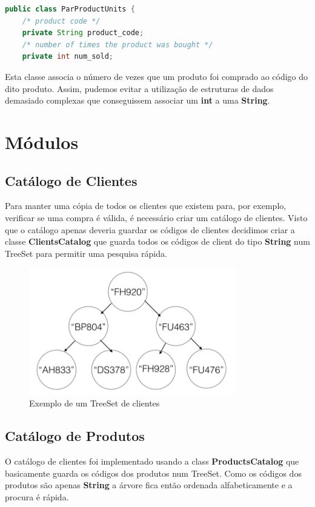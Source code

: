 \documentclass[10pt] {article}
\begin{document}
\begin{lstlisting}[language=Java]
public class ParProductUnits {
	/* product code */
    private String product_code;
    /* number of times the product was bought */
    private int num_sold;
\end{lstlisting}

\par Esta classe associa o número de vezes que um produto foi comprado ao código do dito produto. Assim, pudemos evitar
a utilização de estruturas de dados demasiado complexas que conseguissem associar um \textbf{int} a uma \textbf{String}.

\newpage
\section{Módulos}
\subsection{Catálogo de Clientes}
\par Para manter uma cópia de todos os clientes que existem para, por exemplo, verificar se uma compra é válida, é necessário
criar um catálogo de clientes. Visto que o catálogo apenas deveria guardar os códigos de clientes decidimos criar a classe
\textbf{ClientsCatalog} que guarda todos os códigos de client do tipo \textbf{String} num TreeSet para permitir uma pesquisa
rápida.

\begin{figure}[ht!]
\centering
\includegraphics[width=90mm]{catclientes.png}
\caption{Exemplo de um TreeSet de clientes}
\end{figure}

\newpage
\subsection{Catálogo de Produtos}
\par O catálogo de clientes foi implementado usando a class  \textbf{ProductsCatalog} que basicamente guarda os códigos
dos produtos num TreeSet. Como os códigos dos produtos são apenas \textbf{String} a árvore fica então ordenada
alfabeticamente e a procura é rápida.
\end{document}

